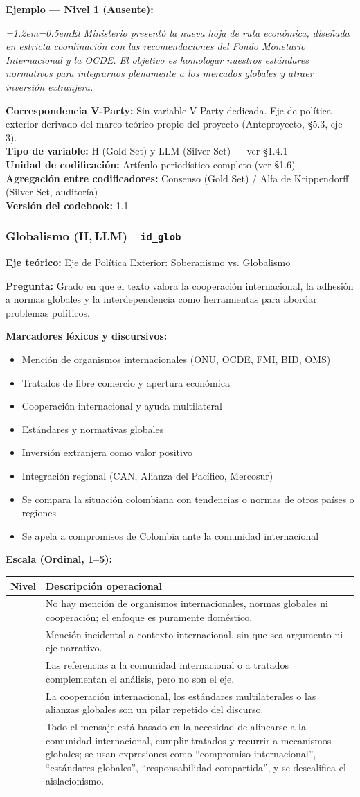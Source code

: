 \documentclass[11pt,letterpaper]{article}
\newcommand{\metaficha}[1]{%
  \par\smallskip\noindent\footnotesize\color{gris}%
  \textbf{Correspondencia V-Party:} #1\\
  \textbf{Tipo de variable:} H (Gold Set) y LLM (Silver Set) — ver §1.4.1\\
  \textbf{Unidad de codificación:} Artículo periodístico completo (ver §1.6)\\
  \textbf{Agregación entre codificadores:} Consenso (Gold Set) / Alfa de Krippendorff (Silver Set, auditoría)\\
  \textbf{Versión del codebook:} 1.1\par\normalsize\color{black}\medskip}
\newcommand{\ejemplo}[2]{%
  \par\smallskip\noindent\textbf{Ejemplo — #1:}\par\nopagebreak
  \begingroup\itshape\small\leftskip=1.2em\rightskip=0.5em\noindent #2\par\endgroup\smallskip}
\newcommand{\dimtitulo}[2]{\subsubsection*{#1 \normalfont\small\color{gris}(H,\,LLM)\ \ \texttt{#2}}%
  \addcontentsline{toc}{subsubsection}{#1}}
\begin{document}
\ejemplo{Nivel 1 (Ausente)}{El Ministerio presentó la nueva hoja de ruta económica, diseñada en estricta
coordinación con las recomendaciones del Fondo Monetario Internacional y la OCDE. El objetivo es homologar
nuestros estándares normativos para integrarnos plenamente a los mercados globales y atraer inversión
extranjera.}

\metaficha{Sin variable V-Party dedicada. Eje de política exterior derivado del marco teórico propio del
proyecto (Anteproyecto, §5.3, eje 3).}

\dimtitulo{Globalismo}{id\_glob}
\textbf{Eje teórico:} Eje de Política Exterior: Soberanismo vs. Globalismo

\textbf{Pregunta:} Grado en que el texto valora la cooperación internacional, la adhesión a normas globales y
la interdependencia como herramientas para abordar problemas políticos.

\textbf{Marcadores léxicos y discursivos:}
\begin{itemize}
\item Mención de organismos internacionales (ONU, OCDE, FMI, BID, OMS)
\item Tratados de libre comercio y apertura económica
\item Cooperación internacional y ayuda multilateral
\item Estándares y normativas globales
\item Inversión extranjera como valor positivo
\item Integración regional (CAN, Alianza del Pacífico, Mercosur)
\item Se compara la situación colombiana con tendencias o normas de otros países o regiones
\item Se apela a compromisos de Colombia ante la comunidad internacional
\end{itemize}

\textbf{Escala (Ordinal, 1–5):}
\begin{longtable}{@{}>{\centering\arraybackslash}p{1.1cm}p{14.3cm}@{}}
\toprule \textbf{Nivel} & \textbf{Descripción operacional}\\ \midrule\endhead
1 & No hay mención de organismos internacionales, normas globales ni cooperación; el enfoque es puramente
doméstico.\\
\addlinespace
2 & Mención incidental a contexto internacional, sin que sea argumento ni eje narrativo.\\
\addlinespace
3 & Las referencias a la comunidad internacional o a tratados complementan el análisis, pero no son el eje.\\
\addlinespace
4 & La cooperación internacional, los estándares multilaterales o las alianzas globales son un pilar repetido
del discurso.\\
\addlinespace
5 & Todo el mensaje está basado en la necesidad de alinearse a la comunidad internacional, cumplir tratados
y recurrir a mecanismos globales; se usan expresiones como “compromiso internacional”, “estándares
globales”, “responsabilidad compartida”, y se descalifica el aislacionismo.\\
\bottomrule
\end{longtable}
\end{document}
